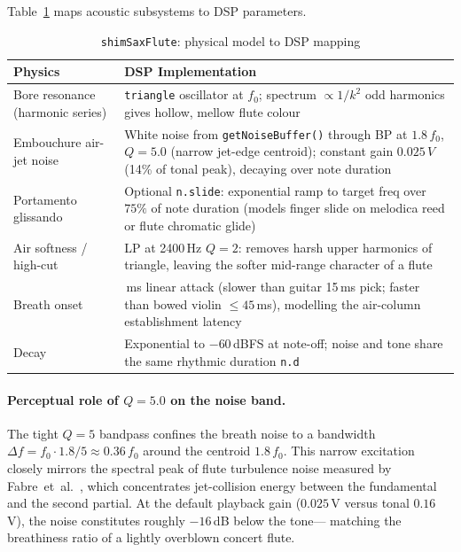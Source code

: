\documentclass[10pt,journal,compsoc,twocolumn]{article}
\begin{document}
Table~\ref{tab:saxflute_components} maps acoustic subsystems to DSP parameters.

\begin{table}[h]
\centering
\caption{\texttt{shimSaxFlute}: physical model to DSP mapping}
\label{tab:saxflute_components}
\scriptsize
\setlength{\tabcolsep}{3pt}
\renewcommand{\arraystretch}{1.12}
\begin{tabularx}{\columnwidth}{@{}
  >{\raggedright\arraybackslash}p{2.1cm}
  >{\raggedright\arraybackslash}X
@{}}
\toprule
\textbf{Physics} & \textbf{DSP Implementation} \\
\midrule
Bore resonance (harmonic series) &
\texttt{triangle} oscillator at $f_0$; spectrum $\propto 1/k^2$
odd harmonics gives hollow, mellow flute colour \\
Embouchure air-jet noise &
White noise from \texttt{getNoiseBuffer()} through BP at
$1.8\,f_0$, $Q=5.0$ (narrow jet-edge centroid); constant gain
$0.025\,V$ (14\% of tonal peak), decaying over note duration \\
Portamento glissando &
Optional \texttt{n.slide}: exponential ramp to target freq
over $75\%$ of note duration (models finger slide on melodica
reed or flute chromatic glide) \\
Air softness / high-cut &
LP at 2400\,Hz $Q=2$: removes harsh upper harmonics of
triangle, leaving the softer mid-range character of a flute \\
Breath onset &
25\,ms linear attack (slower than guitar 15\,ms pick; faster
than bowed violin $\leq 45$\,ms), modelling the air-column
establishment latency \\
Decay &
Exponential to $-60$\,dBFS at note-off; noise and tone share
the same rhythmic duration \texttt{n.d} \\
\bottomrule
\end{tabularx}
\end{table}

\paragraph{Perceptual role of $Q=5.0$ on the noise band.}
The tight $Q=5$ bandpass confines the breath noise to a bandwidth
$\Delta f = f_0 \cdot 1.8 / 5 \approx 0.36\,f_0$ around the centroid
$1.8\,f_0$.  This narrow excitation closely mirrors the spectral peak of
flute turbulence noise measured by Fabre~et~al.~\cite{fabre1996flute}, which
concentrates jet-collision energy between the fundamental and the second
partial.  At the default playback gain ($0.025$\,V versus tonal
$0.16$\,V), the noise constitutes roughly $-16$\,dB below the tone---
matching the breathiness ratio of a lightly overblown concert flute.
\end{document}
